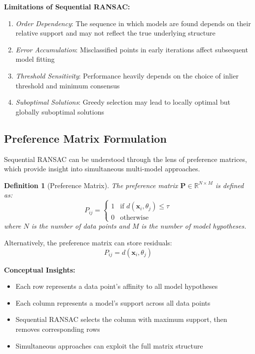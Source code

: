 \documentclass[12pt]{article}
\renewcommand{\vec}[1]{\mathbf{#1}}
\newtheorem{definition}[theorem]{Definition}
\begin{document}
\textbf{Limitations of Sequential RANSAC:}
\begin{enumerate}
    \item \textit{Order Dependency}: The sequence in which models are found depends on their relative support and may not reflect the true underlying structure
    \item \textit{Error Accumulation}: Misclassified points in early iterations affect subsequent model fitting
    \item \textit{Threshold Sensitivity}: Performance heavily depends on the choice of inlier threshold and minimum consensus
    \item \textit{Suboptimal Solutions}: Greedy selection may lead to locally optimal but globally suboptimal solutions
\end{enumerate}

\subsection{Preference Matrix Formulation}
\label{subsec:preference_matrix}

Sequential RANSAC can be understood through the lens of preference matrices, which provide insight into simultaneous multi-model approaches.

\begin{definition}[Preference Matrix]
    \label{def:preference_matrix}
    The preference matrix $\mathbf{P} \in \mathbb{R}^{N \times M}$ is defined as:
    \begin{equation}
        P_{ij} = \begin{cases}
            1 & \text{if } d(\vec{x}_i, \theta_j) \leq \tau \\
            0 & \text{otherwise}
        \end{cases}
        \label{eq:preference_matrix_binary}
    \end{equation}
    where $N$ is the number of data points and $M$ is the number of model hypotheses.
\end{definition}

Alternatively, the preference matrix can store residuals:
\begin{equation}
    P_{ij} = d(\vec{x}_i, \theta_j)
    \label{eq:preference_matrix_residual}
\end{equation}

\textbf{Conceptual Insights:}
\begin{itemize}
    \item Each row represents a data point's affinity to all model hypotheses
    \item Each column represents a model's support across all data points
    \item Sequential RANSAC selects the column with maximum support, then removes corresponding rows
    \item Simultaneous approaches can exploit the full matrix structure
\end{itemize}
\end{document}
